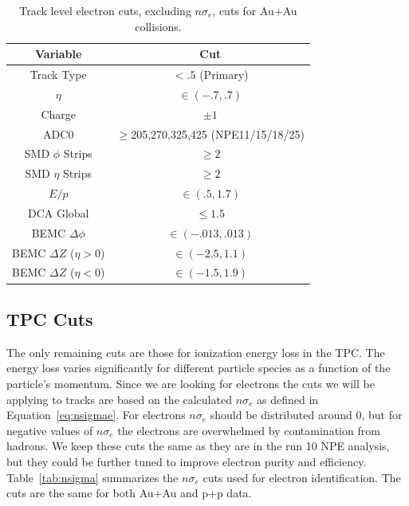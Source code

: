 \begin{table}
\centering
\begin{tabular}{|c|c|}
\hline
Variable            & Cut \\
\hline
Track Type    & $<.5$ (Primary) \\
\hline
$\eta$          & $\in(-.7, .7)$ \\
\hline
Charge               & $\pm 1$ \\
\hline
ADC0          & $\geq$205,270,325,425 (NPE11/15/18/25) \\
\hline
SMD $\phi$ Strips        & $\geq 2$ \\
\hline
SMD $\eta$ Strips        & $\geq 2$ \\
\hline
 $E/p$        & $\in(.5, 1.7)$ \\
\hline
DCA Global        & $\leq 1.5$ \\
\hline
BEMC $\Delta\phi$        & $\in(-.013, .013)$ \\
\hline
BEMC $\Delta Z$ ($\eta > 0$)    & $\in(-2.5, 1.1)$ \\
\hline
BEMC $\Delta Z$ ($\eta < 0$)    & $\in(-1.5, 1.9)$ \\
\hline
\end{tabular}
\caption[Electron Cuts]{Track level electron cuts, excluding $n\sigma_e$, cuts for Au+Au collisions.}
\label{tab:ecuts}
\end{table}

\subsection{TPC Cuts}

The only remaining cuts are those for ionization energy loss in the TPC. The energy loss varies significantly for different particle species as a function of the particle's momentum. Since we are looking for electrons the cuts we will be applying to tracks are based on the calculated $n\sigma_e$ as defined in Equation~\ref{eq:nsigmae}. For electrons $n\sigma_e$ should be distributed around 0, but for negative values of $n\sigma_e$ the electrons are overwhelmed by contamination from hadrons. We keep these cuts the same as they are in the run 10 NPE analysis, but they could be further tuned to improve electron purity and efficiency. Table~\ref{tab:nsigma} summarizes the $n\sigma_e$ cuts used for electron identification. The cuts are the same for both Au+Au and p+p data.

